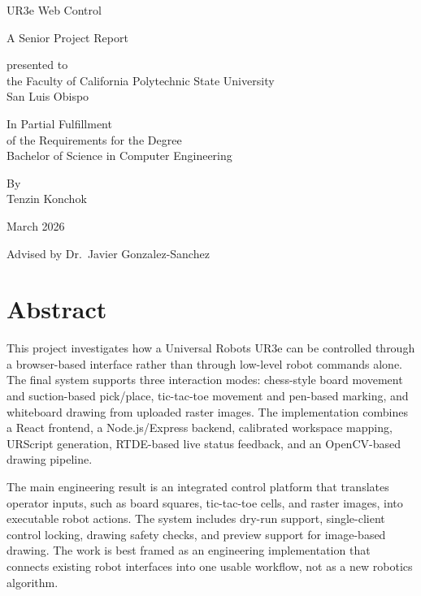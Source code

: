 \documentclass[12pt]{article}
\begin{document}
\begin{titlepage}
\centering

{\LARGE UR3e Web Control\par}
\vspace{0.35in}
{\Large A Senior Project Report\par}

\vspace{0.8in}
presented to\\
the Faculty of California Polytechnic State University\\
San Luis Obispo

\vspace{0.6in}
In Partial Fulfillment\\
of the Requirements for the Degree\\
Bachelor of Science in Computer Engineering

\vspace{0.6in}
By\\
Tenzin Konchok

\vspace{0.8in}
March 2026

\vspace{0.6in}
Advised by Dr.~Javier Gonzalez-Sanchez
\end{titlepage}


\section*{Abstract}
This project investigates how a Universal Robots UR3e can be controlled through a browser-based interface rather than through low-level robot commands alone. The final system supports three interaction modes: chess-style board movement and suction-based pick/place, tic-tac-toe movement and pen-based marking, and whiteboard drawing from uploaded raster images. The implementation combines a React frontend, a Node.js/Express backend, calibrated workspace mapping, URScript generation, RTDE-based live status feedback, and an OpenCV-based drawing pipeline.

The main engineering result is an integrated control platform that translates operator inputs, such as board squares, tic-tac-toe cells, and raster images, into executable robot actions. The system includes dry-run support, single-client control locking, drawing safety checks, and preview support for image-based drawing. The work is best framed as an engineering implementation that connects existing robot interfaces into one usable workflow, not as a new robotics algorithm.
\end{document}
